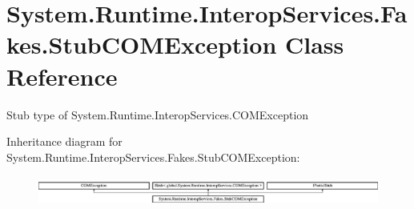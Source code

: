 \hypertarget{class_system_1_1_runtime_1_1_interop_services_1_1_fakes_1_1_stub_c_o_m_exception}{\section{System.\-Runtime.\-Interop\-Services.\-Fakes.\-Stub\-C\-O\-M\-Exception Class Reference}
\label{class_system_1_1_runtime_1_1_interop_services_1_1_fakes_1_1_stub_c_o_m_exception}
}


Stub type of System.\-Runtime.\-Interop\-Services.\-C\-O\-M\-Exception 


Inheritance diagram for System.\-Runtime.\-Interop\-Services.\-Fakes.\-Stub\-C\-O\-M\-Exception\-:\begin{figure}[H]
\begin{center}
\leavevmode
\includegraphics[height=0.982456cm]{class_system_1_1_runtime_1_1_interop_services_1_1_fakes_1_1_stub_c_o_m_exception}
\end{center}
\end{figure}
